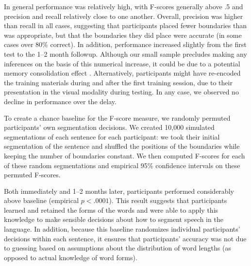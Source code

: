 \documentclass[10pt]{article}
\begin{document}
In general performance was relatively high, with F-scores generally above .5 and precision and recall relatively close to one another. Overall, precision was higher than recall in all cases, suggesting that participants placed fewer boundaries than was appropriate, but that the boundaries they did place were accurate (in some cases over 80\% correct). In addition, performance increased slightly from the first test to the 1--2 month followup. Although our small sample precludes making any inferences on the basis of this numerical increase, it could be due to a potential memory consolidation effect \cite{mcgaugh2000}. Alternatively, participants might have re-encoded the training materials during and after the first training session, due to their presentation in the visual modality during testing. In any case, we observed no decline in performance over the delay.

To create a chance baseline for the F-score measure, we randomly permuted participants' own segmentation decisions. We created 10,000 simulated segmentations of each sentence for each participant: we took their initial segmentation of the sentence and shuffled the positions of the boundaries while keeping the number of boundaries constant. We then computed F-scores for each of these random segmentations and empirical 95\% confidence intervals on these permuted F-scores. 

Both immediately and 1--2 months later, participants performed considerably above baseline (empirical $p < .0001$). This result suggests that participants learned and retained the forms of the words and were able to apply this knowledge to make sensible decisions about how to segment speech in the language. In addition, because this baseline randomizes individual participants' decisions within each sentence, it ensures that participants' accuracy was not due to guessing based on assumptions about the distribution of word lengths (as opposed to actual knowledge of word forms). 
\end{document}

